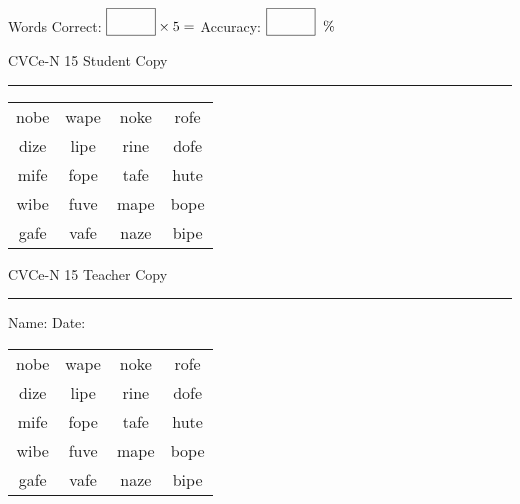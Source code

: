 \documentclass{memoir}
\begin{document}
\small

Words Correct: $\fbox{\phantom{\huge 100}} \times 5 = $ Accuracy: $\fbox{\phantom{\huge 100}}\;\; \%$ 

\vfill

\newpage


\footnotesize \noindent
CVCe-N 15 \hfill Student Copy
\smallskip
\hrule

\Large

\setlength{\tabcolsep}{14pt}
\def\arraystretch{2}

{\selectfont


\begin{vplace}[0.5]
\begin{center}
\begin{tabular}{cccc}
nobe & wape & noke & rofe \\
dize & lipe & rine & dofe \\
mife & fope & tafe & hute \\
wibe & fuve & mape & bope \\
gafe & vafe & naze & bipe \\
\end{tabular}
\end{center}
\end{vplace}

}

\newpage

\footnotesize \noindent
CVCe-N 15 \hfill Teacher Copy
\smallskip
\hrule

\small

\vfill

\noindent
Name: \underline{\hspace{1.75in}} \hfill Date: \underline{\hspace{1in}}

\Large

{\selectfont


\begin{vplace}[0.5]
\begin{center}
\begin{tabular}{cccc}
nobe & wape & noke & rofe \\
dize & lipe & rine & dofe \\
mife & fope & tafe & hute \\
wibe & fuve & mape & bope \\
gafe & vafe & naze & bipe \\
\end{tabular}
\end{center}
\end{vplace}



}
\end{document}
